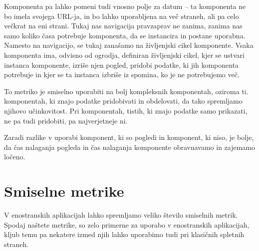 \documentclass[a4paper, 12pt]{book}
\begin{document}
Komponenta pa lahko pomeni tudi vnosno polje za datum -- ta komponenta ne bo imela svojega URL-ja, in bo lahko uporabljena na več straneh, ali pa celo večkrat na eni strani. Tukaj nas navigacija pravzaprav ne zanima, zanima nas samo koliko časa potrebuje komponenta, da se instancira in postane uporabna. Namesto na navigacijo, se tukaj zanašamo na življenjski cikel komponente. Vsaka komponenta ima, odvisno od ogrodja, definiran življenjski cikel, kjer se ustvari instanca komponente, izriše njen pogled, pridobi podatke, ki jih komponenta potrebuje in kjer se ta instanca izbriše iz spomina, ko je ne potrebujemo več.

To metriko je smiselno uporabiti na bolj kompleksnih komponentah, oziroma ti.  komponentah, ki znajo podatke pridobivati in obdelovati, da tako spremljamo njihovo učinkovitost. Pri  komponentah, tistih, ki znajo podatke samo prikazati, ne pa tudi pridobiti, pa najverjetneje ni.

Zaradi razlike v uporabi komponent, ki so pogledi in komponent, ki niso, je bolje, da čas nalaganja pogleda in čas nalaganja komponente obravnavamo in zajemamo ločeno.

\section{Smiselne metrike}
\label{ch1:section5}

V enostranskih aplikacijah lahko spremljamo veliko število smiselnih metrik. Spodaj naštete metrike, so zelo primerne za uporabo v enostranskih aplikacijah, kljub temu pa nekatere izmed njih lahko uporabimo tudi pri klasičnih spletnih straneh.
\end{document}
